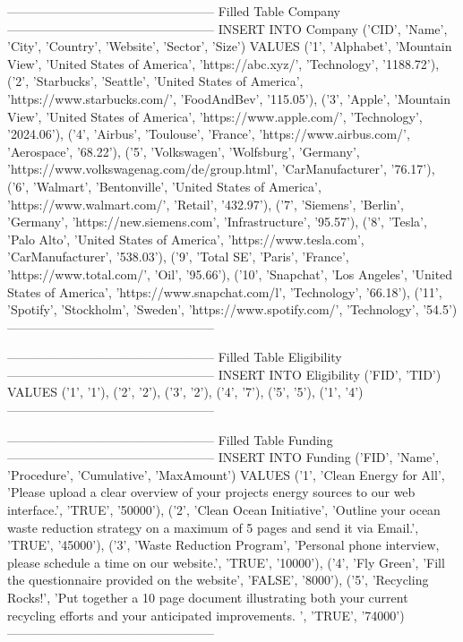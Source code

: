--------------------------------------------------
Filled Table Company
--------------------------------------------------
INSERT INTO 
Company ('CID', 'Name', 'City', 'Country', 'Website', 'Sector', 'Size')
VALUES ('1', 'Alphabet', 'Mountain View', 'United States of America', 'https://abc.xyz/', 'Technology', '1188.72'),
	('2', 'Starbucks', 'Seattle', 'United States of America', 'https://www.starbucks.com/', 'FoodAndBev', '115.05'),
	('3', 'Apple', 'Mountain View', 'United States of America', 'https://www.apple.com/', 'Technology', '2024.06'),
	('4', 'Airbus', 'Toulouse', 'France', 'https://www.airbus.com/', 'Aerospace', '68.22'),
	('5', 'Volkswagen', 'Wolfsburg', 'Germany', 'https://www.volkswagenag.com/de/group.html', 'CarManufacturer', '76.17'),
	('6', 'Walmart', 'Bentonville', 'United States of America', 'https://www.walmart.com/', 'Retail', '432.97'),
	('7', 'Siemens', 'Berlin', 'Germany', 'https://new.siemens.com', 'Infrastructure', '95.57'),
	('8', 'Tesla', 'Palo Alto', 'United States of America', 'https://www.tesla.com', 'CarManufacturer', '538.03'),
	('9', 'Total SE', 'Paris', 'France', 'https://www.total.com/', 'Oil', '95.66'),
	('10', 'Snapchat', 'Los Angeles', 'United States of America', 'https://www.snapchat.com/l', 'Technology', '66.18'),
	('11', 'Spotify', 'Stockholm', 'Sweden', 'https://www.spotify.com/', 'Technology', '54.5')
--------------------------------------------------

--------------------------------------------------
Filled Table Eligibility
--------------------------------------------------
INSERT INTO 
Eligibility ('FID', 'TID')
VALUES ('1', '1'),
	('2', '2'),
	('3', '2'),
	('4', '7'),
	('5', '5'),
	('1', '4')
--------------------------------------------------

--------------------------------------------------
Filled Table Funding
--------------------------------------------------
INSERT INTO 
Funding ('FID', 'Name', 'Procedure', 'Cumulative', 'MaxAmount')
VALUES ('1', 'Clean Energy for All', 'Please upload a clear overview of your projects energy sources to our web interface.', 'TRUE', '50000'),
	('2', 'Clean Ocean Initiative', 'Outline your ocean waste reduction strategy on a maximum of 5 pages and send it via Email.', 'TRUE', '45000'),
	('3', 'Waste Reduction Program', 'Personal phone interview, please schedule a time on our website.', 'TRUE', '10000'),
	('4', 'Fly Green', 'Fill the questionnaire provided on the website', 'FALSE', '8000'),
	('5', 'Recycling Rocks!', 'Put together a 10 page document illustrating both your current recycling efforts and your anticipated improvements. ', 'TRUE', '74000')
--------------------------------------------------

